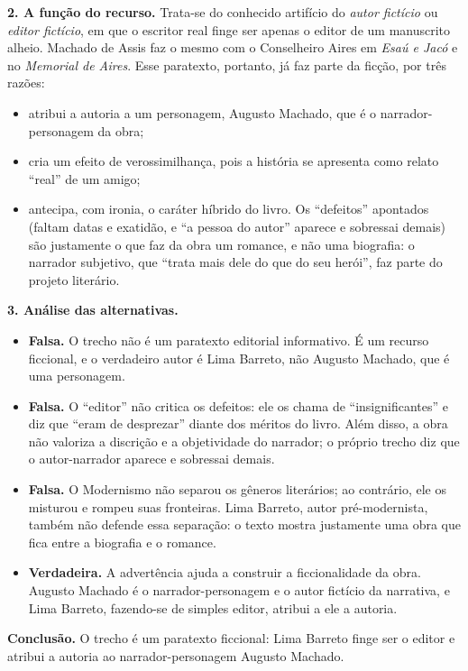 \documentclass{article}%
\begin{document}
\textbf{2. A função do recurso.} Trata-se do conhecido artifício do \emph{autor fictício} ou \emph{editor fictício}, em que o escritor real finge ser apenas o editor de um manuscrito alheio. Machado de Assis faz o mesmo com o Conselheiro Aires em \emph{Esaú e Jacó} e no \emph{Memorial de Aires}. Esse paratexto, portanto, já faz parte da ficção, por três razões:
\begin{itemize}
\item atribui a autoria a um personagem, Augusto Machado, que é o narrador-personagem da obra;
\item cria um efeito de verossimilhança, pois a história se apresenta como relato ``real'' de um amigo;
\item antecipa, com ironia, o caráter híbrido do livro. Os ``defeitos'' apontados (faltam datas e exatidão, e ``a pessoa do autor'' aparece e sobressai demais) são justamente o que faz da obra um romance, e não uma biografia: o narrador subjetivo, que ``trata mais dele do que do seu herói'', faz parte do projeto literário.
\end{itemize}

\textbf{3. Análise das alternativas.}
\begin{itemize}
\item[a)] \textbf{Falsa.} O trecho não é um paratexto editorial informativo. É um recurso ficcional, e o verdadeiro autor é Lima Barreto, não Augusto Machado, que é uma personagem.
\item[b)] \textbf{Falsa.} O ``editor'' não critica os defeitos: ele os chama de ``insignificantes'' e diz que ``eram de desprezar'' diante dos méritos do livro. Além disso, a obra não valoriza a discrição e a objetividade do narrador; o próprio trecho diz que o autor-narrador aparece e sobressai demais.
\item[c)] \textbf{Falsa.} O Modernismo não separou os gêneros literários; ao contrário, ele os misturou e rompeu suas fronteiras. Lima Barreto, autor pré-modernista, também não defende essa separação: o texto mostra justamente uma obra que fica entre a biografia e o romance.
\item[d)] \textbf{Verdadeira.} A advertência ajuda a construir a ficcionalidade da obra. Augusto Machado é o narrador-personagem e o autor fictício da narrativa, e Lima Barreto, fazendo-se de simples editor, atribui a ele a autoria.
\end{itemize}

\textbf{Conclusão.} O trecho é um paratexto ficcional: Lima Barreto finge ser o editor e atribui a autoria ao narrador-personagem Augusto Machado.
\end{document}
